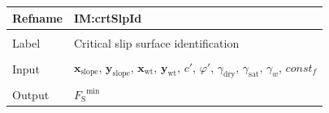 \documentclass[12pt]{article}
\begin{document}
\vspace{\baselineskip}
\noindent
\begin{minipage}{\textwidth}
\begin{tabular}{>{\raggedright}p{}>{\raggedright\arraybackslash}p{}}
\toprule \textbf{Refname} & \textbf{IM:crtSlpId}
\label{IM:crtSlpId}
\\ \midrule \\
Label & Critical slip surface identification
        
\\ \midrule \\
Input & ${\mathbf{x}_{\text{slope}}}$, ${\mathbf{y}_{\text{slope}}}$, ${\mathbf{x}_{\text{wt}}}$, ${\mathbf{y}_{\text{wt}}}$, $c'$, $φ'$, ${γ_{\text{dry}}}$, ${γ_{\text{sat}}}$, ${γ_{w}}$, $const_f$
        
\\ \midrule \\
Output & ${{F_{\text{S}}}^{\text{min}}}$
         

\end{tabular}
\end{minipage}
\end{document}
